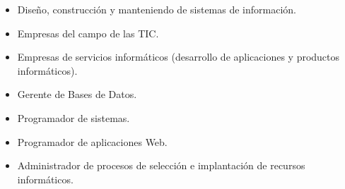 \documentclass[a4paper,11pt]{scrartcl}
\begin{document}
\begin{itemize}
\item Diseño, construcción y manteniendo de sistemas de información.
\item Empresas del campo de las TIC.
\item Empresas de servicios informáticos (desarrollo de aplicaciones y productos informáticos).
\item Gerente de Bases de Datos.
\item Programador de sistemas.
\item Programador de aplicaciones Web.
\item Administrador de procesos de selección e implantación de recursos informáticos.
\end{itemize}
\end{document}
